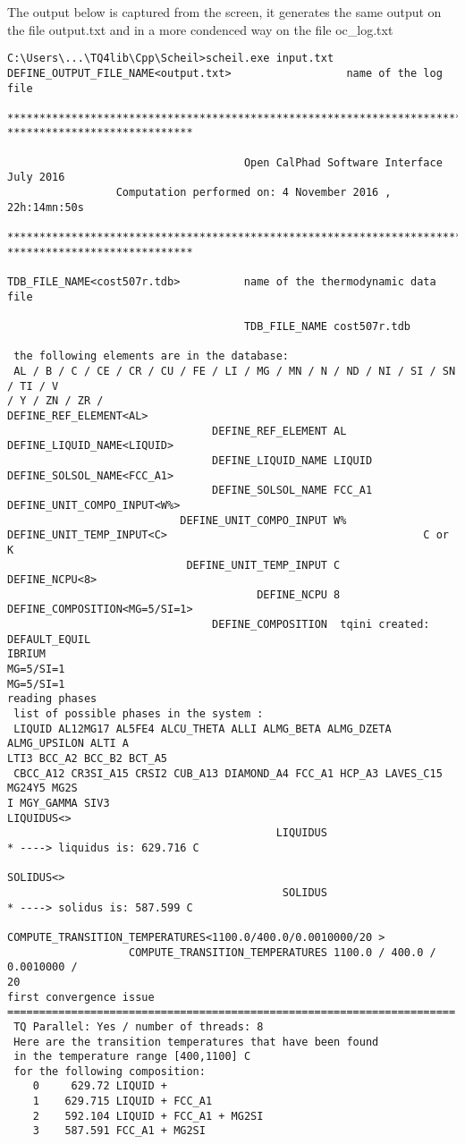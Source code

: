 \documentclass[12pt]{article}
\begin{document}
The output below is captured from the screen, it generates the same
output on the file output.txt and in a more condenced way on the file
oc\_log.txt

{\small
\begin{verbatim}
C:\Users\...\TQ4lib\Cpp\Scheil>scheil.exe input.txt
DEFINE_OUTPUT_FILE_NAME<output.txt>                  name of the log file

********************************************************************************
*****************************

                                     Open CalPhad Software Interface July 2016
                 Computation performed on: 4 November 2016 , 22h:14mn:50s

********************************************************************************
*****************************

TDB_FILE_NAME<cost507r.tdb>          name of the thermodynamic data file

                                     TDB_FILE_NAME cost507r.tdb

 the following elements are in the database:
 AL / B / C / CE / CR / CU / FE / LI / MG / MN / N / ND / NI / SI / SN / TI / V
/ Y / ZN / ZR /
DEFINE_REF_ELEMENT<AL>
                                DEFINE_REF_ELEMENT AL
DEFINE_LIQUID_NAME<LIQUID>
                                DEFINE_LIQUID_NAME LIQUID
DEFINE_SOLSOL_NAME<FCC_A1>
                                DEFINE_SOLSOL_NAME FCC_A1
DEFINE_UNIT_COMPO_INPUT<W%>
                           DEFINE_UNIT_COMPO_INPUT W%
DEFINE_UNIT_TEMP_INPUT<C>                                        C or K
                            DEFINE_UNIT_TEMP_INPUT C
DEFINE_NCPU<8>
                                       DEFINE_NCPU 8
DEFINE_COMPOSITION<MG=5/SI=1>
                                DEFINE_COMPOSITION  tqini created: DEFAULT_EQUIL
IBRIUM
MG=5/SI=1
MG=5/SI=1
reading phases
 list of possible phases in the system :
 LIQUID AL12MG17 AL5FE4 ALCU_THETA ALLI ALMG_BETA ALMG_DZETA ALMG_UPSILON ALTI A
LTI3 BCC_A2 BCC_B2 BCT_A5
 CBCC_A12 CR3SI_A15 CRSI2 CUB_A13 DIAMOND_A4 FCC_A1 HCP_A3 LAVES_C15 MG24Y5 MG2S
I MGY_GAMMA SIV3
LIQUIDUS<>
                                          LIQUIDUS
* ----> liquidus is: 629.716 C

SOLIDUS<>
                                           SOLIDUS
* ----> solidus is: 587.599 C

COMPUTE_TRANSITION_TEMPERATURES<1100.0/400.0/0.0010000/20 >
                   COMPUTE_TRANSITION_TEMPERATURES 1100.0 / 400.0 / 0.0010000 /
20
first convergence issue
======================================================================
 TQ Parallel: Yes / number of threads: 8
 Here are the transition temperatures that have been found
 in the temperature range [400,1100] C
 for the following composition:
    0     629.72 LIQUID +
    1    629.715 LIQUID + FCC_A1
    2    592.104 LIQUID + FCC_A1 + MG2SI
    3    587.591 FCC_A1 + MG2SI


\end{verbatim}}
\end{document}
